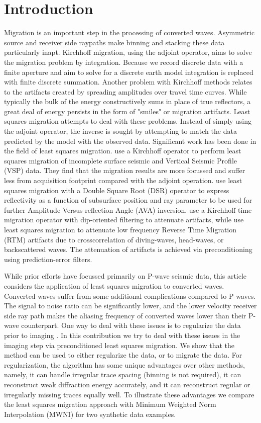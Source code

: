 \section{Introduction}
Migration is an important step in the processing of converted waves. Asymmetric source and receiver side raypaths make binning and stacking these data particularly inapt. Kirchhoff migration, using the adjoint operator, aims to solve the migration problem by integration. Because we record discrete data with a finite aperture and aim to solve for a discrete earth model integration is replaced with finite discrete summation. Another problem with Kirchhoff methods relates to the artifacts created by spreading amplitudes over travel time curves. While typically the bulk of the energy constructively sums in place of true reflectors, a great deal of energy persists in the form of "smiles" or migration artifacts. Least squares migration attempts to deal with these problems. Instead of simply using the adjoint operator, the inverse is sought by attempting to match the data predicted by the model with the observed data. Significant work has been done in the field of least squares migration. \cite{nemeth1999least} use a Kirchhoff operator to perform least squares migration of incomplete surface seismic and Vertical Seismic Profile (VSP) data. They find that the migration results are more focussed and suffer less from acquisition footprint compared with the adjoint operation. \cite{Kuehl01012003} use least squares migration with a Double Square Root (DSR) operator to express reflectivity as a function of subsurface position and ray parameter to be used for further Amplitude Versus reflection Angle (AVA) inversion. \cite{ricardo2010} use a Kirchhoff time migration operator with dip-oriented filtering to attenuate artifacts, while \cite{doi:10.1190/1.2399367} use least squares migration to attenuate low frequency Reverse Time Migration (RTM) artifacts due to crosscorrelation of diving-waves, head-waves, or backscattered waves. The attenuation of artifacts is achieved via preconditioning using prediction-error filters. 

While prior efforts have focussed primarily on P-wave seismic data, this article considers the application of least squares migration to converted waves. Converted waves suffer from some additional complications compared to P-waves. The signal to noise ratio can be significantly lower, and the lower velocity receiver side ray path makes the aliasing frequency of converted waves lower than their P-wave counterpart. One way to deal with these issues is to regularize the data prior to imaging \citep{caryps5d}. In this contribution we try to deal with these issues in the imaging step via preconditioned least squares migration. We show that the method can be used to either regularize the data, or to migrate the data. For regularization, the algorithm has some unique advantages over other methods, namely, it can handle irregular trace spacing (binning is not required), it can reconstruct weak diffraction energy accurately, and it can reconstruct regular or irregularly missing traces equally well. To illustrate these advantages we compare the least squares migration approach with Minimum Weighted Norm Interpolation (MWNI) for two synthetic data examples.  

